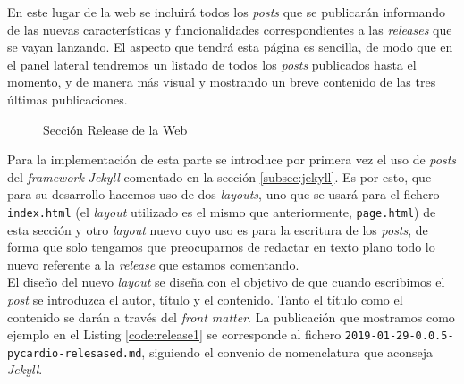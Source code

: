 En este lugar de la web se incluirá todos los \textit{posts} que se publicarán informando de las nuevas características y funcionalidades correspondientes a las \textit{releases} que se vayan lanzando. El aspecto que tendrá esta página es sencilla, de modo que en el panel lateral tendremos un listado de todos los \textit{posts} publicados hasta el momento, y de manera más visual y mostrando un breve contenido de las tres últimas publicaciones. 

\begin{figure}[H]
    \centering
    \caption{Sección Release de la Web}
    \label{fig:releaseWeb}
\end{figure}

Para la implementación de esta parte se introduce por primera vez el uso de \textit{posts} del \textit{framework} \textit{Jekyll} comentado en la sección \ref{subsec:jekyll}. Es por esto, que para su desarrollo hacemos uso de dos \textit{layouts}, uno que se usará para el fichero \texttt{index.html} (el \textit{layout} utilizado es el mismo que anteriormente, \texttt{page.html}) de esta sección y otro \textit{layout} nuevo cuyo uso es para la escritura de los \textit{posts}, de forma que solo tengamos que preocuparnos de redactar en texto plano todo lo nuevo referente a la \textit{release} que estamos comentando. \\

El diseño del nuevo \textit{layout} se diseña con el objetivo de que cuando escribimos el \textit{post} se introduzca el autor, título y el contenido. Tanto el título como el contenido se darán a través del \textit{front matter}. La publicación que mostramos como ejemplo en el Listing \ref{code:release1} se corresponde al fichero \texttt{2019-01-29-0.0.5-pycardio-relesased.md}, siguiendo el convenio de nomenclatura que aconseja \textit{Jekyll}. \\


